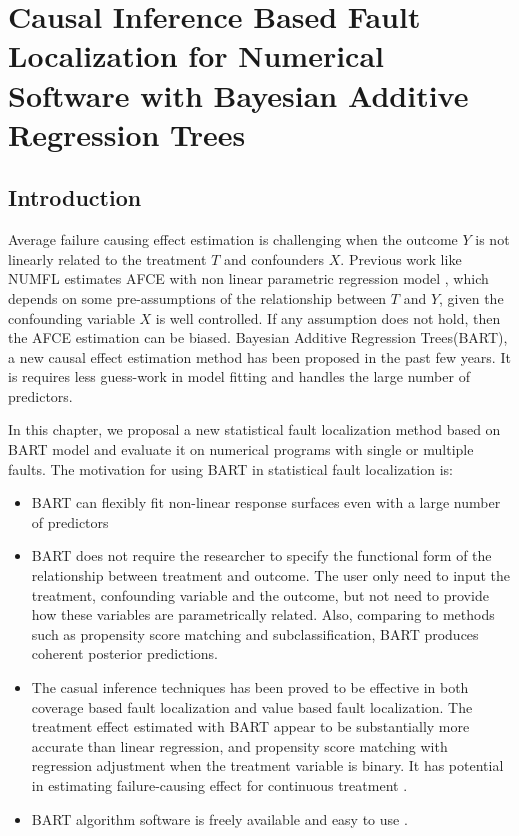 \chapter{Causal Inference Based Fault Localization for Numerical Software with Bayesian Additive Regression Trees}\label{chap:BART}


\section{Introduction}\label{BARTintro}
\vspace{-2pt}
Average failure causing effect estimation is challenging when the outcome $Y$ is not linearly related to the treatment $T$ and confounders $X$. Previous work like NUMFL estimates AFCE with non linear parametric regression model \cite{bai2015numfl}, which depends on some pre-assumptions of the relationship between $T$ and $Y$, given the confounding variable $X$ is well controlled.  If any assumption does not hold, then the AFCE estimation can be biased. Bayesian Additive Regression Trees(BART), a new causal effect estimation method has been proposed in the past few years. It is requires less guess-work in model fitting and handles the large number of predictors.
  
In this chapter, we proposal a new statistical fault localization method based on BART model and evaluate it on numerical programs with single or multiple faults. The motivation for using BART in statistical fault localization is:
\vspace{-0.2cm}
\begin{itemize}
\item BART can flexibly fit non-linear response surfaces even with a large number of predictors
\item BART does not require the researcher to specify the functional form of the relationship between treatment and outcome. The user only need to input the treatment, confounding variable and the outcome, but not need to provide how these variables are parametrically related. Also, comparing to methods such as propensity score matching and subclassification, BART produces coherent posterior predictions.
\item The casual inference techniques has been proved to be effective in both coverage based fault localization and value based fault localization. The treatment effect estimated with BART appear to be substantially more accurate than linear regression, and propensity score matching with regression adjustment when the treatment variable is binary. It has potential in estimating failure-causing effect for continuous treatment \cite{hill2012bayesian, hill2013assessing}.
\item BART algorithm software is freely available and easy to use \cite{BARTMachine}.
\end{itemize}

